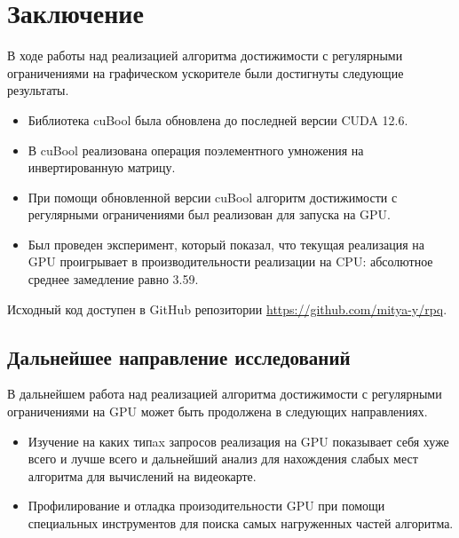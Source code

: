 
\section{Заключение}

В ходе работы над реализацией алгоритма достижимости с регулярными ограничениями на графическом ускорителе были достигнуты следующие результаты.

\begin{itemize}
    \item Библиотека cuBool была обновлена до последней версии CUDA 12.6.
    \item В cuBool реализована операция поэлементного умножения на инвертированную матрицу.
    \item При помощи обновленной версии cuBool алгоритм достижимости с регулярными ограничениями был реализован для запуска на GPU.
    \item Был проведен эксперимент, который показал, что текущая реализация на GPU проигрывает в производительности реализации на CPU: абсолютное среднее замедление равно 3.59.
\end{itemize}

Исходный код доступен в GitHub репозитории \url{https://github.com/mitya-y/rpq}. 

\subsection{Дальнейшее направление исследований}

В дальнейшем работа над реализацией алгоритма достижимости с регулярными ограничениями на GPU может быть продолжена в следующих направлениях.

\begin{itemize}
    \item Изучение на каких типax запросов реализация на GPU показывает себя хуже всего и лучше всего и дальнейший анализ для нахождения слабых мест алгоритма для вычислений на видеокарте.
    \item Профилирование и отладка произодительности GPU при помощи специальных инструментов для поиска самых нагруженных частей алгоритма.
\end{itemize}
